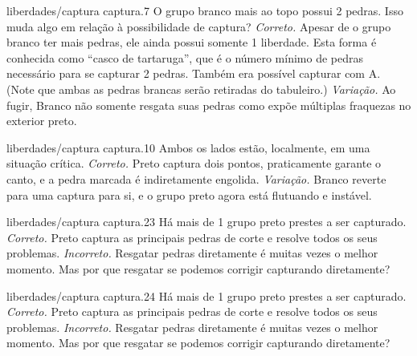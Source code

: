 \problemAnswerDiagram
  {liberdades/captura}
  {captura.7}
  {O grupo branco mais ao topo possui 2 pedras. Isso muda algo em relação à possibilidade de captura?}
  {\emph{Correto.} Apesar de o grupo branco ter mais pedras, ele ainda possui somente 1 liberdade. Esta forma é conhecida como ``casco de tartaruga'', que é o número mínimo de pedras necessário para se capturar 2 pedras. Também era possível capturar com A. (Note que ambas as pedras brancas serão retiradas do tabuleiro.)}
  {\emph{Variação.} Ao fugir, Branco não somente resgata suas pedras como expõe múltiplas fraquezas no exterior preto.}

\problemAnswerDiagram
  {liberdades/captura}
  {captura.10}
  {Ambos os lados estão, localmente, em uma situação crítica.}
  {\emph{Correto.} Preto captura dois pontos, praticamente garante o canto, e a pedra marcada é indiretamente engolida.}
  {\emph{Variação.} Branco reverte para uma captura para si, e o grupo preto agora está flutuando e instável.}

\problemAnswerDiagram
  {liberdades/captura}
  {captura.23}
  {Há mais de 1 grupo preto prestes a ser capturado.}
  {\emph{Correto.} Preto captura as principais pedras de corte e resolve todos os seus problemas.}
  {\emph{Incorreto.} Resgatar pedras diretamente é muitas vezes o melhor momento. Mas por que resgatar se podemos corrigir capturando diretamente?}

\problemAnswerDiagram
  {liberdades/captura}
  {captura.24}
  {Há mais de 1 grupo preto prestes a ser capturado.}
  {\emph{Correto.} Preto captura as principais pedras de corte e resolve todos os seus problemas.}
  {\emph{Incorreto.} Resgatar pedras diretamente é muitas vezes o melhor momento. Mas por que resgatar se podemos corrigir capturando diretamente?}






